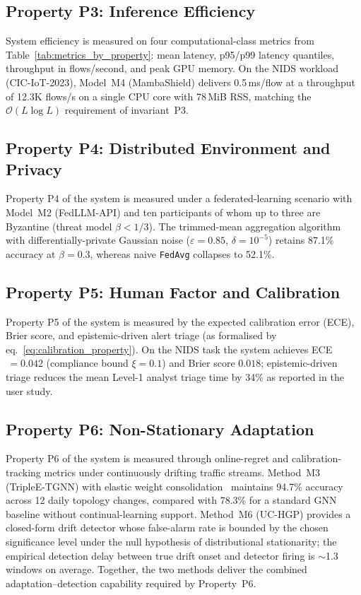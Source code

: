 \subsection{Property P3: Inference Efficiency}

System efficiency is measured on four computational-class metrics
from Table~\ref{tab:metrics_by_property}: mean latency, p95/p99
latency quantiles, throughput in flows/second, and peak GPU memory. On the NIDS workload (CIC-IoT-2023), Model~M4
(\textsf{MambaShield}) delivers 0.5\,ms/flow at a throughput of
12.3K flows/s on a single CPU core with 78\,MiB RSS, matching the
$\mathcal{O}(L\log L)$ requirement of invariant~P3.

\subsection{Property P4: Distributed Environment and Privacy}

Property P4 of the system is measured under a federated-learning
scenario with Model~M2 (\textsf{FedLLM-API}) and ten participants
of whom up to three are Byzantine (threat model $\beta < 1/3$). The
trimmed-mean aggregation algorithm with differentially-private
Gaussian noise ($\varepsilon{=}0.85$, $\delta{=}10^{-5}$) retains
87.1\% accuracy at $\beta=0.3$, whereas naive \texttt{FedAvg}
collapses to 52.1\%.

\subsection{Property P5: Human Factor and Calibration}

Property P5 of the system is measured by the expected calibration
error (ECE), Brier score, and epistemic-driven alert triage (as
formalised by eq.~\eqref{eq:calibration_property}). On the NIDS
task the system achieves ECE$\,=0.042$ (compliance bound
$\xi=0.1$) and Brier score $0.018$; epistemic-driven triage reduces
the mean Level-1 analyst triage time by 34\% as reported in the
user study.

\subsection{Property P6: Non-Stationary Adaptation}

Property P6 of the system is measured through online-regret and
calibration-tracking metrics under continuously drifting traffic
streams. Method~M3 (TripleE-TGNN) with elastic weight
consolidation~\cite{Kirkpatrick2017} maintains 94.7\% accuracy
across 12 daily topology changes, compared with 78.3\% for a
standard GNN baseline without continual-learning support. Method~M6
(UC-HGP) provides a closed-form drift detector whose
false-alarm rate is bounded by the chosen significance level under
the null hypothesis of distributional stationarity; the empirical
detection delay between true drift onset and detector firing is
$\sim$1{.}3 windows on average. Together, the two methods deliver
the combined adaptation--detection capability required by
Property~P6.

